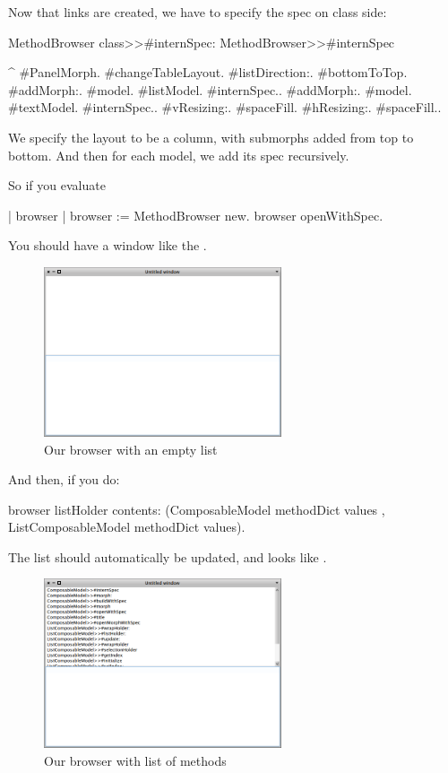 \documentclass[a4paper,10pt,twoside]{book}
\begin{document}
Now that links are created, we have to specify the spec on class side:

\begin{method}{MethodBrowser class>>\#internSpec:}
MethodBrowser>>#internSpec

	^{ #PanelMorph.
			#changeTableLayout.
			#listDirection:. #bottomToTop.
			#addMorph:. {#model. #listModel. #internSpec.}.
			#addMorph:. {#model. #textModel. #internSpec.}.
			#vResizing:. #spaceFill.
			#hResizing:. #spaceFill.}.
\end{method}
We specify the layout to be a column, with submorphs added from top to bottom.
And then for each model, we add its spec recursively.

So if you evaluate
\begin{code}{}
| browser |
browser := MethodBrowser new.
browser openWithSpec.
\end{code}
You should have a window like the .
\begin{figure}[ht]
\begin{center}
	\includegraphics[width=7cm]{MethodBrowser1}
	\caption{Our browser with an empty list}
\end{center}
\end{figure}

And then, if you do:
\begin{code}{}
browser  listHolder contents: (ComposableModel methodDict values , ListComposableModel methodDict values).
\end{code}
The list should automatically be updated, and looks like .
\begin{figure}[ht]
\begin{center}
	\includegraphics[width=7cm]{MethodBrowser2}
	\caption{Our browser with list of methods}
\end{center}
\end{figure}
\end{document}
